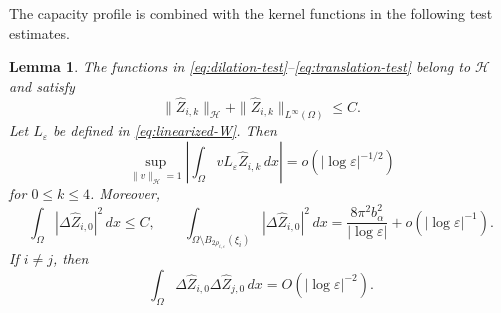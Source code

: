 \documentclass[11pt]{article}
\newtheorem{lemma}[theorem]{Lemma}
\numberwithin{equation}{section}
\begin{document}
The capacity profile is combined with the kernel functions in the following test estimates.

\begin{lemma}\label{lem:test-functions}
The functions in \eqref{eq:dilation-test}--\eqref{eq:translation-test}
belong to $\mathcal H$ and satisfy
\begin{equation}\label{eq:test-H-bound}
\|\widehat Z_{i,k}\|_{\mathcal H}
+\|\widehat Z_{i,k}\|_{L^\infty(\Omega)}
\leq C.
\end{equation}
Let $L_\varepsilon$ be defined in \eqref{eq:linearized-W}. Then
\begin{equation}\label{eq:test-L-small}
\sup_{\|v\|_{\mathcal H}=1}
\left|
\int_\Omega vL_\varepsilon\widehat Z_{i,k}\,dx
\right|
=o(|\log\varepsilon|^{-1/2})
\end{equation}
for $0\leq k\leq4$. Moreover,
\begin{equation}\label{eq:dilation-test-energy}
\int_\Omega|\Delta\widehat Z_{i,0}|^2\,dx\leq C,
\qquad
\int_{\Omega\setminus B_{2\rho_{i,\varepsilon}}(\xi_i)}
|\Delta\widehat Z_{i,0}|^2\,dx
=\frac{8\pi^2b_\alpha^2}{|\log\varepsilon|}
+o(|\log\varepsilon|^{-1}).
\end{equation}
If $i\ne j$, then
\begin{equation}\label{eq:dilation-test-cross-energy}
\int_\Omega
\Delta\widehat Z_{i,0}\Delta\widehat Z_{j,0}\,dx
=O(|\log\varepsilon|^{-2}).
\end{equation}
\end{lemma}
\end{document}
